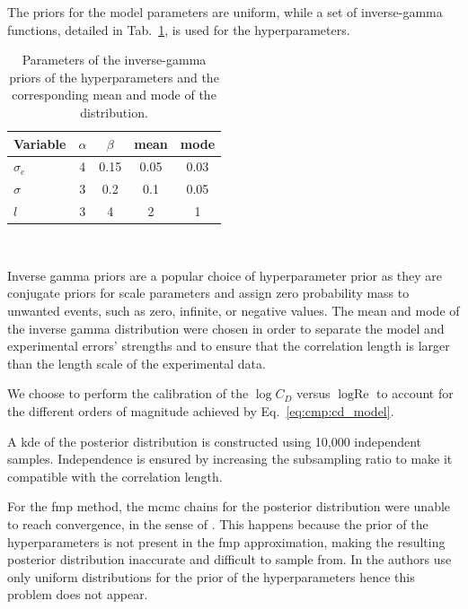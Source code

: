 \smallskip
The priors for the model parameters are uniform, while a set of inverse-gamma functions, detailed in Tab.~\ref{tab:cmp:hpar}, is used for the hyperparameters. 

\begin{table}[htbp]
    \centering 
    \begin{tabular}{|p{5em} || c | c ||  c | c |}
    \hline
        \textbf{Variable}  & $\alpha$ & $\beta$ & \textbf{mean} & \textbf{mode} \\
    \hline \hline
    $\sigma_e$ & 4 & 0.15 & 0.05 & 0.03\\ 
    $\sigma$  & 3 & 0.2& 0.1 & 0.05\\ 
    $l$ & 3 & 4 & 2 & 1\\ 
    \hline
    \end{tabular}
    \\[10pt]
    \caption{Parameters of the inverse-gamma priors of the hyperparameters and the corresponding mean and mode of the distribution.}
    \label{tab:cmp:hpar}
\end{table}


Inverse gamma priors are a popular choice of hyperparameter prior as they are conjugate priors for scale parameters \cite{uq_theory} and assign zero probability mass to unwanted events, such as zero, infinite, or negative values. The mean and mode of the inverse gamma distribution were chosen in order to separate the model and experimental errors'  strengths and to ensure that the correlation length is larger than the length scale of the experimental data.

\smallskip
We choose to perform the calibration of the $\log C_D$ versus $\log \text{Re}$ to account for the different orders of magnitude achieved by Eq.~\eqref{eq:cmp:cd_model}. 

\bigskip
A \gls{kde} of the posterior distribution is constructed using 10,000 independent samples. Independence is ensured by increasing the subsampling ratio to make it compatible with the correlation length.

\smallskip
For the \gls{fmp} method, the \gls{mcmc} chains for the posterior distribution were unable to reach convergence, in the sense of \cite{roy2019_MCMC}. This happens because the prior of the hyperparameters is not present in the \gls{fmp} approximation, making the resulting posterior distribution inaccurate and difficult to sample from. In \cite{fmp} the authors use only uniform distributions for the prior of the hyperparameters hence this problem does not appear.

